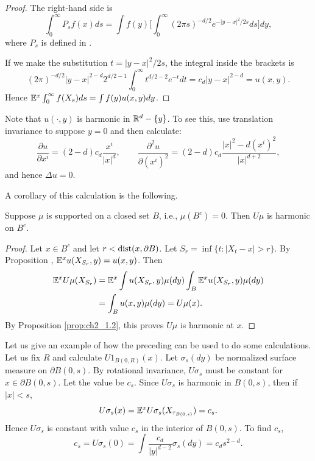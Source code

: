 \begin{proof}
The right-hand side is
\[
    \int_0^\infty P_sf(x)ds = \int f(y)\Big[\int_0^\infty (2\pi s)^{-d/2}e^{-|y-x|^2/2s}ds\Big]dy,
\]
where $P_s$ is defined in .

If we make the substitution $t = |y-x|^2/2s$, the integral inside the brackets is
\[
    (2\pi)^{-d/2}|y-x|^{2-d}2^{d/2-1} \int_0^\infty t^{d/2-2}e^{-t}dt = c_d|y-x|^{2-d} = u(x,y).
\]
Hence $\mathbb{E}^x\int_0^\infty f(X_s)ds = \int f(y)u(x,y)dy$.
\end{proof}

Note that $u(\cdot,y)$ is harmonic in $\mathbb{R}^d - \{y\}$. To see this, use translation invariance to suppose $y = 0$ and then calculate:
\begin{equation}\label{eq:ch2_3.5}
    \frac{\partial u}{\partial x^i} = (2-d)c_d\frac{x^i}{|x|^d}, \qquad \frac{\partial^2 u}{\partial(x^i)^2} = (2-d)c_d\frac{|x|^2 - d(x^i)^2}{|x|^{d+2}},
\end{equation}
and hence $\Delta u = 0$.

A corollary of this calculation is the following.

\begin{proposition}\label{prop:ch2_3.2}
Suppose $\mu$ is supported on a closed set $B$, i.e., $\mu(B^c) = 0$. Then $U\mu$ is harmonic on $B^c$.
\end{proposition}

\begin{proof}
Let $x \in B^c$ and let $r < \operatorname{dist}(x,\partial B)$. Let $S_r = \inf\{t : |X_t-x| > r\}$. By Proposition , $\mathbb{E}^x u(X_{S_r},y) = u(x,y)$. Then
\begin{align*}
    \mathbb{E}^x U\mu(X_{S_r}) &= \mathbb{E}^x \int u(X_{S_r},y)\mu(dy)\int_B \mathbb{E}^x u(X_{S_r},y)\mu(dy) \\
    &= \int_B u(x,y)\mu(dy) = U\mu(x).
\end{align*}
\mnewpage
By Proposition \ref{prop:ch2_1.2}, this proves $U\mu$ is harmonic at $x$.
\end{proof}

Let us give an example of how the preceding can be used to do some calculations. Let us fix $R$ and calculate $U1_{B(0,R)}(x)$. Let $\sigma_s(dy)$ be normalized surface measure on $\partial B(0,s)$. By rotational invariance, $U\sigma_s$ must be constant for $x \in \partial B(0,s)$. Let the value be $c_s$. Since $U\sigma_s$ is harmonic in $B(0,s)$, then if $|x| < s$,
\[
    U\sigma_s(x) = \mathbb{E}^x U\sigma_s(X_{\tau_{B(0,s)}}) = c_s.
\]
Hence $U\sigma_s$ is constant with value $c_s$ in the interior of $B(0,s)$. To find $c_s$,
\[
    c_s = U\sigma_s(0) = \int \frac{c_d}{|y|^{d-2}}\sigma_s(dy) = c_ds^{2-d}.
\]

